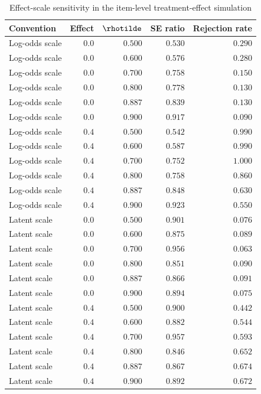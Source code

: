 \begin{table}[htbp]\centering
\caption{Effect-scale sensitivity in the item-level treatment-effect simulation}
\label{tab:s6-te-scale}
{\small\begin{tabular}{lrrrr}
\toprule
Convention & Effect & $\rhotilde$ & SE ratio & Rejection rate \\
\midrule
Log-odds scale & $0.0$ & $0.500$ & $0.530$ & $0.290$ \\
Log-odds scale & $0.0$ & $0.600$ & $0.576$ & $0.280$ \\
Log-odds scale & $0.0$ & $0.700$ & $0.758$ & $0.150$ \\
Log-odds scale & $0.0$ & $0.800$ & $0.778$ & $0.130$ \\
Log-odds scale & $0.0$ & $0.887$ & $0.839$ & $0.130$ \\
Log-odds scale & $0.0$ & $0.900$ & $0.917$ & $0.090$ \\
Log-odds scale & $0.4$ & $0.500$ & $0.542$ & $0.990$ \\
Log-odds scale & $0.4$ & $0.600$ & $0.587$ & $0.990$ \\
Log-odds scale & $0.4$ & $0.700$ & $0.752$ & $1.000$ \\
Log-odds scale & $0.4$ & $0.800$ & $0.758$ & $0.860$ \\
Log-odds scale & $0.4$ & $0.887$ & $0.848$ & $0.630$ \\
Log-odds scale & $0.4$ & $0.900$ & $0.923$ & $0.550$ \\
Latent scale & $0.0$ & $0.500$ & $0.901$ & $0.076$ \\
Latent scale & $0.0$ & $0.600$ & $0.875$ & $0.089$ \\
Latent scale & $0.0$ & $0.700$ & $0.956$ & $0.063$ \\
Latent scale & $0.0$ & $0.800$ & $0.851$ & $0.090$ \\
Latent scale & $0.0$ & $0.887$ & $0.866$ & $0.091$ \\
Latent scale & $0.0$ & $0.900$ & $0.894$ & $0.075$ \\
Latent scale & $0.4$ & $0.500$ & $0.900$ & $0.442$ \\
Latent scale & $0.4$ & $0.600$ & $0.882$ & $0.544$ \\
Latent scale & $0.4$ & $0.700$ & $0.957$ & $0.593$ \\
Latent scale & $0.4$ & $0.800$ & $0.846$ & $0.652$ \\
Latent scale & $0.4$ & $0.887$ & $0.867$ & $0.674$ \\
Latent scale & $0.4$ & $0.900$ & $0.892$ & $0.672$ \\
\bottomrule
\end{tabular}}
\end{table}
